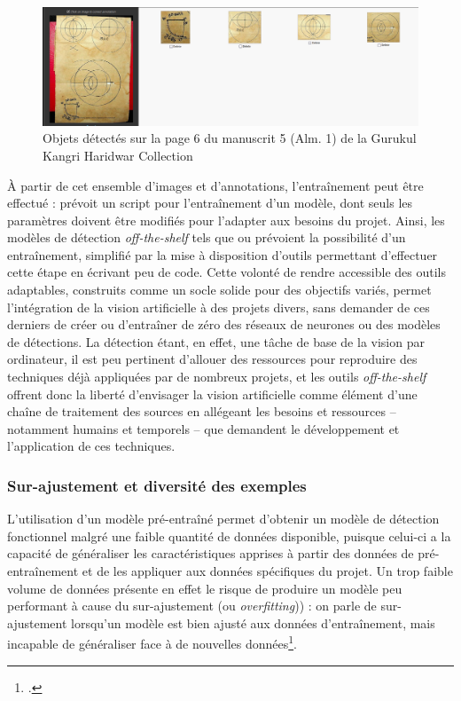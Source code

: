 	   	\begin{figure}[H]
			\centering
			\includegraphics[width=15cm]{images/ms143_p6.png}
			\caption{Objets détectés sur la page 6 du manuscrit 5 (Alm. 1) de la Gurukul Kangri Haridwar Collection }
			\label{fig:annotation_ms143}
		\end{figure}
	
		À partir de cet ensemble d'images et d'annotations, l'entraînement peut être effectué : \yolov prévoit un script pour l'entraînement d'un modèle, dont seuls les paramètres doivent être modifiés pour l'adapter aux besoins du projet. Ainsi, les modèles de détection \textit{off-the-shelf} tels que \yolo ou \docex prévoient la possibilité d'un entraînement, simplifié par la mise à disposition d'outils permettant d'effectuer cette étape en écrivant peu de code. Cette volonté de rendre accessible des outils adaptables, construits comme un socle solide pour des objectifs variés, permet l'intégration de la vision artificielle à des projets divers, sans demander de ces derniers de créer ou d'entraîner de zéro des réseaux de neurones ou des modèles de détections. La détection étant, en effet, une tâche de base de la vision par ordinateur, il est peu pertinent d'allouer des ressources pour reproduire des techniques déjà appliquées par de nombreux projets, et les outils \textit{off-the-shelf} offrent donc la liberté d'envisager la vision artificielle comme élément d'une chaîne de traitement des sources en allégeant les besoins et ressources -- notamment humains et temporels -- que demandent le développement et l'application de ces techniques. 

        \subsubsection{Sur-ajustement et diversité des exemples}
		
		L'utilisation d'un modèle pré-entraîné permet d'obtenir un modèle de détection fonctionnel malgré une faible quantité de données disponible, puisque celui-ci a la capacité de généraliser les caractéristiques apprises à partir des données de pré-entraînement et de les appliquer aux données spécifiques du projet. Un trop faible volume de données présente en effet le risque de produire un modèle peu performant à cause du sur-ajustement (ou \textit{overfitting})) : on parle de sur-ajustement lorsqu'un modèle est bien ajusté aux données d'entraînement, mais incapable de généraliser face à de nouvelles données\footcite{cholletApprentissageProfondAvec2020a}. 
		
